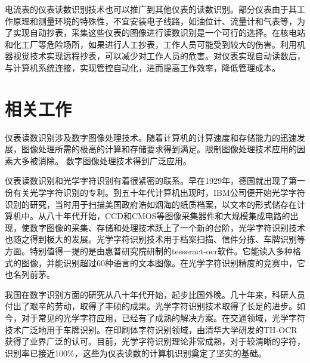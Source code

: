 电流表的仪表读数识别技术也可以推广到其他仪表的读数识别。部分仪表由于其工作原理和测量环境的特殊性，不宜安装电子线路，如油位计、流量计和气表等，为了实现自动抄表，采集这些仪表的图像进行读数识别是一个可行的选择。在核电站和化工厂等危险场所，如果进行人工抄表，工作人员可能受到较大的伤害。利用机器视觉技术实现远程抄表，可以减少对工作人员的危害。对仪表实现自动读数后，与计算机系统连接，实现管控自动化，进而提高工作效率，降低管理成本。

\section{相关工作}

仪表读数识别涉及数字图像处理技术。随着计算机的计算速度和存储能力的迅速发展，图像处理所需的极高的计算和存储要求得到满足。限制图像处理技术应用的因素大多被消除。 数字图像处理技术得到广泛应用。

仪表读数识别和光学字符识别有着很紧密的联系。早在1929年，德国就出现了第一份有关光学字符识别的专利。到五十年代计算机出现时，IBM公司便开始光学字符识别的研究，当时用于扫描美国政府浩如烟海的纸质档案，以文本的形式储存在计算机中。从八十年代开始，CCD和CMOS等图像采集器件和大规模集成电路的出现，使数字图像的采集、存储和处理技术跃上了一个新的台阶，光学字符识别技术也随之得到极大的发展。光学字符识别技术用于档案扫描、信件分拣、车牌识别等方面。特别值得一提的是由惠普研究院研制的tesseract-ocr软件。它能读入多种格式的图像，并能识别超过60种语言的文本图像。在光学字符识别精度的竞赛中，它也名列前茅。

我国在数字识别方面的研究从八十年代开始，起步比国外晚。几十年来，科研人员付出了艰辛的劳动，取得了丰硕的成果。光学字符识别技术取得了长足的进步。如今，对于常见的光学字符应用，已经有了成熟的解决方案。在交通领域，光学字符技术广泛地用于车牌识别。在印刷体字符识别领域，由清华大学研发的TH-OCR获得了业界广泛的认可。目前，光学字符识别理论非常成熟，对于较清晰的字符，识别率已接近100\%，这些为仪表读数的计算机识别奠定了坚实的基础。

